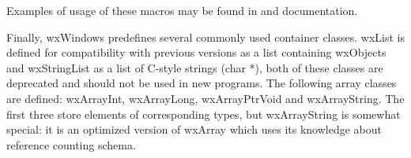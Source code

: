 Examples of usage of these macros may be found in  and
 documentation.

Finally, wxWindows predefines several commonly used container classes. wxList
is defined for compatibility with previous versions as a list containing
wxObjects and wxStringList as a list of C-style strings (char *), both of these
classes are deprecated and should not be used in new programs. The following
array classes are defined: wxArrayInt, wxArrayLong, wxArrayPtrVoid and
wxArrayString. The first three store elements of corresponding types, but
wxArrayString is somewhat special: it is an optimized version of wxArray which
uses its knowledge about  reference counting
schema.

